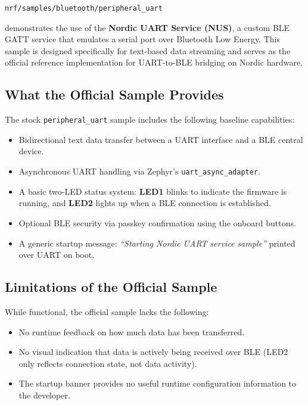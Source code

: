 \documentclass[conference]{IEEEtran}
\begin{document}
\begin{center}
\texttt{nrf/samples/bluetooth/peripheral\_uart}
\end{center}

\noindent demonstrates the use of the \textbf{Nordic UART Service (NUS)}, a 
custom BLE GATT service that emulates a serial port over Bluetooth Low Energy. 
This sample is designed specifically for text-based data streaming and serves 
as the official reference implementation for UART-to-BLE bridging on Nordic 
hardware.

\subsection{What the Official Sample Provides}
The stock \texttt{peripheral\_uart} sample includes the following baseline 
capabilities:
\begin{itemize}
    \item Bidirectional text data transfer between a UART interface and a BLE 
    central device.
    \item Asynchronous UART handling via Zephyr's \texttt{uart\_async\_adapter}.
        \item A basic two-LED status system: \textbf{LED1} blinks to indicate the 
    firmware is running, and \textbf{LED2} lights up when a BLE connection is 
    established.
    \item Optional BLE security via passkey confirmation using the onboard buttons.
    \item A generic startup message: \textit{``Starting Nordic UART service sample''} 
    printed over UART on boot.
\end{itemize}

\subsection{Limitations of the Official Sample}
While functional, the official sample lacks the following:
\begin{itemize}
    \item No runtime feedback on how much data has been transferred.
    \item No visual indication that data is actively being received over BLE 
    (LED2 only reflects connection state, not data activity).
    \item The startup banner provides no useful runtime configuration information 
    to the developer.
\end{itemize}
\end{document}
